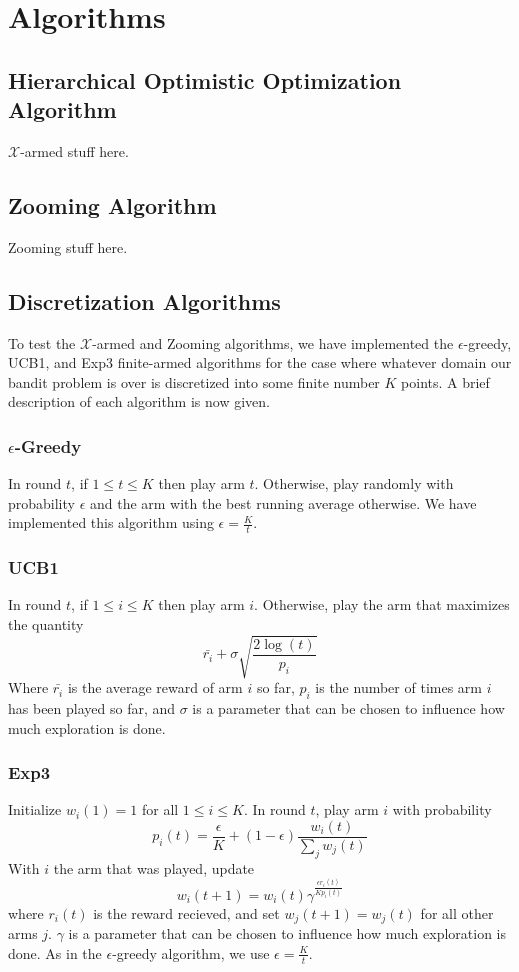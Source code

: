 \section{Algorithms}
\subsection{Hierarchical Optimistic Optimization Algorithm}
$\mathcal{X}$-armed stuff here.

\subsection{Zooming Algorithm}
Zooming stuff here.

\subsection{Discretization Algorithms}
To test the $\mathcal{X}$-armed and Zooming algorithms, we have implemented
the $\epsilon$-greedy, UCB1, and Exp3 finite-armed algorithms for
the case where whatever domain our bandit problem is over is discretized
into some finite number $K$ points.  A brief description of each algorithm
is now given.

\subsubsection{$\epsilon$-Greedy}
In round $t$, if $1 \leq t \leq K$ then play arm $t$.  Otherwise, play
randomly with probability $\epsilon$ and the arm with the best running
average otherwise.  We have implemented this algorithm using
$\epsilon = \frac{K}{t}$.

\subsubsection{UCB1}
In round $t$, if $1 \leq i \leq K$ then play arm $i$.  Otherwise, play
the arm that maximizes the quantity
\[
	\bar{r_i} + \sigma \sqrt{\frac{2 \log(t)}{p_i}}
\]
Where $\bar{r_i}$ is the average reward of arm $i$ so far, $p_i$ is the 
number of times arm $i$ has been played so far, and $\sigma$ is a parameter
that can be chosen to influence how much exploration is done.

\subsubsection{Exp3}
Initialize $w_i(1) = 1$ for all $1 \leq i \leq K$.  In round $t$, play
arm $i$ with probability
\[
	p_i(t) = \frac{\epsilon}{K} + (1 - \epsilon) \frac{w_i(t)}{\sum_j w_j(t)}
\]
With $i$ the arm that was played, update
\[
	w_i(t+1) = w_i(t)\gamma^{\frac{\epsilon r_i(t)}{K p_i(t)}}
\]
where $r_i(t)$ is the reward recieved, and set $w_j(t+1) = w_j(t)$ for all
other arms $j$.  $\gamma$ is a parameter that can be chosen to influence how
much exploration is done.  As in the $\epsilon$-greedy algorithm, we use
$\epsilon = \frac{K}{t}$.